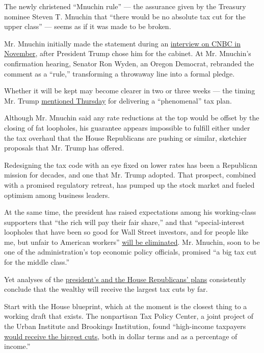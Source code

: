 The newly christened ``Mnuchin rule'' --- the assurance given by the
Treasury nominee Steven T. Mnuchin that ``there would be no absolute tax
cut for the upper class'' --- seems as if it was made to be broken.

Mr. Mnuchin initially made the statement during an
\href{http://www.cnbc.com/2016/11/30/exclusive-steve-mnuchin-no-absolute-tax-cut-for-the-upper-class.html}{interview
on CNBC in November}, after President Trump chose him for the cabinet.
At Mr. Mnuchin's confirmation hearing, Senator Ron Wyden, an Oregon
Democrat, rebranded the comment as a ``rule,'' transforming a throwaway
line into a formal pledge.

Whether it will be kept may become clearer in two or three weeks --- the
timing Mr. Trump
\href{https://www.nytimes.com/video/business/dealbook/100000004922130/trump-on-phenomenal-tax-plan.html}{mentioned
Thursday} for delivering a ``phenomenal'' tax plan.

Although Mr. Mnuchin said any rate reductions at the top would be offset
by the closing of fat loopholes, his guarantee appears impossible to
fulfill either under the tax overhaul that the House Republicans are
pushing or similar, sketchier proposals that Mr. Trump has offered.

Redesigning the tax code with an eye fixed on lower rates has been a
Republican mission for decades, and one that Mr. Trump adopted. That
prospect, combined with a promised regulatory retreat, has pumped up the
stock market and fueled optimism among business leaders.

At the same time, the president has raised expectations among his
working-class supporters that ``the rich will pay their fair share,''
and that ``special-interest loopholes that have been so good for Wall
Street investors, and for people like me, but unfair to American
workers''
\href{http://www.cnbc.com/2016/08/08/restrained-trump-goes-at-clinton-for-tax-plan.html}{will
be eliminated}. Mr. Mnuchin, soon to be one of the administration's top
economic policy officials, promised ``a big tax cut for the middle
class.''

Yet analyses of the
\href{https://www.nytimes.com/2016/11/13/business/economy/trump-and-congress-both-want-tax-cuts-the-question-is-which-ones.html}{president's
and the House Republicans' plans} consistently conclude that the wealthy
will receive the largest tax cuts by far.

Start with the House blueprint, which at the moment is the closest thing
to a working draft that exists. The nonpartisan Tax Policy Center, a
joint project of the Urban Institute and Brookings Institution, found
``high-income taxpayers
\href{http://www.taxpolicycenter.org/publications/analysis-house-gop-tax-plan}{would
receive the biggest cuts}, both in dollar terms and as a percentage of
income.''

